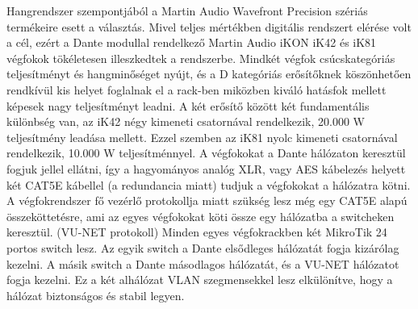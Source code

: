 Hangrendszer szempontjából a Martin Audio Wavefront Precision szériás termékeire esett a választás.
Mivel teljes mértékben digitális rendszert elérése volt a cél, ezért a Dante modullal
rendelkező Martin Audio iKON iK42 és iK81 végfokok tökéletesen illeszkedtek a rendszerbe.
Mindkét végfok csúcskategóriás teljesítményt és hangminőséget nyújt, és a D kategóriás
erősítőknek köszönhetően rendkívül kis helyet foglalnak el a rack-ben miközben kiváló hatásfok
mellett képesek nagy teljesítményt leadni. A két erősítő között két fundamentális különbség van,
az iK42 négy kimeneti csatornával rendelkezik, 20.000 W teljesítmény leadása mellett. 
Ezzel szemben az iK81 nyolc kimeneti csatornával rendelkezik, 10.000 W teljesítménnyel.
A végfokokat a Dante hálózaton keresztül fogjuk jellel ellátni, így a hagyományos analóg XLR, vagy AES kábelezés helyett
két CAT5E kábellel (a redundancia miatt) tudjuk a végfokokat a hálózatra kötni. 
A végfokrendszer fő vezérlő protokollja miatt szükség lesz még egy CAT5E alapú
összeköttetésre, ami az egyes végfokokat köti össze egy hálózatba a switcheken keresztül. (VU-NET protokoll)
Minden egyes végfokrackben két MikroTik 24 portos switch lesz. Az egyik switch a Dante elsődleges hálózatát fogja kizárólag kezelni.
A másik switch a Dante másodlagos hálózatát, és a VU-NET hálózatot fogja kezelni.
Ez a két alhálózat VLAN szegmensekkel lesz elkülönítve, hogy a hálózat biztonságos és stabil legyen.
